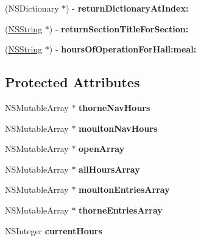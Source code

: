 \begin{DoxyCompactItemize}
\item 
\hypertarget{interface_schedule_decider_a152b6ee6cae722ee3289163eb2dde095}{
(NSDictionary $\ast$) -\/ {\bfseries returnDictionaryAtIndex:}}
\label{interface_schedule_decider_a152b6ee6cae722ee3289163eb2dde095}

\item 
\hypertarget{interface_schedule_decider_af86ea6d31fa0019ebe6d1a8801069fce}{
(\hyperlink{class_n_s_string}{NSString} $\ast$) -\/ {\bfseries returnSectionTitleForSection:}}
\label{interface_schedule_decider_af86ea6d31fa0019ebe6d1a8801069fce}

\item 
\hypertarget{interface_schedule_decider_aae10e8394acbce30b21e7bf40a96344a}{
(\hyperlink{class_n_s_string}{NSString} $\ast$) -\/ {\bfseries hoursOfOperationForHall:meal:}}
\label{interface_schedule_decider_aae10e8394acbce30b21e7bf40a96344a}

\end{DoxyCompactItemize}
\subsection*{Protected Attributes}
\begin{DoxyCompactItemize}
\item 
\hypertarget{interface_schedule_decider_a17df0e5330ee60a6544982c3186a680d}{
NSMutableArray $\ast$ {\bfseries thorneNavHours}}
\label{interface_schedule_decider_a17df0e5330ee60a6544982c3186a680d}

\item 
\hypertarget{interface_schedule_decider_a4f782e7c833b68fea6837c0a23212212}{
NSMutableArray $\ast$ {\bfseries moultonNavHours}}
\label{interface_schedule_decider_a4f782e7c833b68fea6837c0a23212212}

\item 
\hypertarget{interface_schedule_decider_a11b1b1fae973a40c801ed9835710d3ca}{
NSMutableArray $\ast$ {\bfseries openArray}}
\label{interface_schedule_decider_a11b1b1fae973a40c801ed9835710d3ca}

\item 
\hypertarget{interface_schedule_decider_a05577bb9f92fe4f258e96d2080e541b9}{
NSMutableArray $\ast$ {\bfseries allHoursArray}}
\label{interface_schedule_decider_a05577bb9f92fe4f258e96d2080e541b9}

\item 
\hypertarget{interface_schedule_decider_a88e006c783c68d676bb36144699a1b74}{
NSMutableArray $\ast$ {\bfseries moultonEntriesArray}}
\label{interface_schedule_decider_a88e006c783c68d676bb36144699a1b74}

\item 
\hypertarget{interface_schedule_decider_a8a5431730ad9505e63fa29b285af161b}{
NSMutableArray $\ast$ {\bfseries thorneEntriesArray}}
\label{interface_schedule_decider_a8a5431730ad9505e63fa29b285af161b}

\item 
\hypertarget{interface_schedule_decider_aa16aa2c90013b6269f2405242ba70fd0}{
NSInteger {\bfseries currentHours}}
\label{interface_schedule_decider_aa16aa2c90013b6269f2405242ba70fd0}

\end{DoxyCompactItemize}
